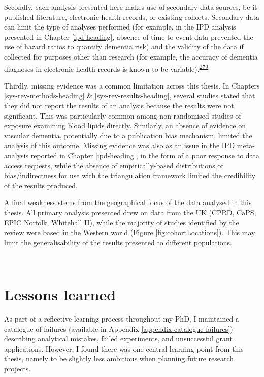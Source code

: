 \documentclass[a4paper, twoside]{templates/ociamthesis}
\begin{document}
Secondly, each analysis presented here makes use of secondary data sources, be it published literature, electronic health records, or existing cohorts. Secondary data can limit the type of analyses performed (for example, in the IPD analysis presented in Chapter \ref{ipd-heading}, absence of time-to-event data prevented the use of hazard ratios to quantify dementia risk) and the validity of the data if collected for purposes other than research (for example, the accuracy of dementia diagnoses in electronic health records is known to be variable).\textsuperscript{\protect\hyperlink{ref-wilkinson2018}{279}}

Thirdly, missing evidence was a common limitation across this thesis. In Chapters \ref{sys-rev-methods-heading} \& \ref{sys-rev-results-heading}, several studies stated that they did not report the results of an analysis because the results were not significant. This was particularly common among non-randomised studies of exposure examining blood lipids directly. Similarly, an absence of evidence on vascular dementia, potentially due to a publication bias mechanism, limited the analysis of this outcome. Missing evidence was also as an issue in the IPD meta-analysis reported in Chapter \ref{ipd-heading}, in the form of a poor response to data access requests, while the absence of empirically-based distributions of bias/indirectness for use with the triangulation framework limited the credibility of the results produced.

A final weakness stems from the geographical focus of the data analysed in this thesis. All primary analysis presented drew on data from the UK (CPRD, CaPS, EPIC Norfolk, Whitehall II), while the majority of studies identified by the review were based in the Western world (Figure \ref{fig:cohortLocations}). This may limit the generalisability of the results presented to different populations.

~

\hypertarget{lessons-learned}{%
\section{Lessons learned}\label{lessons-learned}}

As part of a reflective learning process throughout my PhD, I maintained a catalogue of failures (available in Appendix \ref{appendix-catalogue-failures}) describing analytical mistakes, failed experiments, and unsuccessful grant applications. However, I found there was one central learning point from this thesis, namely to be slightly less ambitious when planning future research projects.
\end{document}

